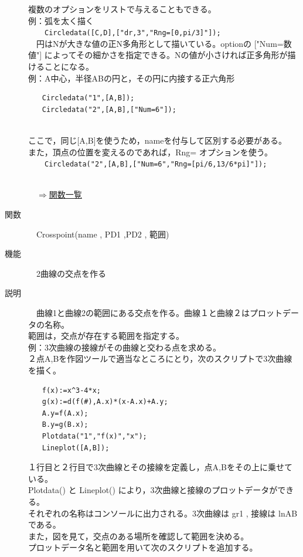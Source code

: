 \documentclass[papersize,a4paper,12pt,uplatex]{jsarticle}
\begin{document}
\begin{description}
複数のオプションをリストで与えることもできる。\\

例：弧を太く描く\\
　　\verb|Circledata([C,D],["dr,3","Rng=[0,pi/3]"]);|\\

　円はNが大きな値の正N多角形として描いている。optionの ["Num=数値"] によってその細かさを指定できる。Nの値が小さければ正多角形が描けることになる。\\
例：A中心，半径ABの円と，その円に内接する正六角形
\begin{verbatim}
　　Circledata("1",[A,B]);
　　Circledata("2",[A,B],["Num=6"]);
\end{verbatim}
　　　　　　　　\\
ここで，同じ[A,B]を使うため，nameを付与して区別する必要がある。\\
また，頂点の位置を変えるのであれば，Rng= オプションを使う。\\
　　\verb|Circledata("2",[A,B],["Num=6","Rng=[pi/6,13/6*pi]"]);|\\
　　　　　　　　\\
\begin{flushright}　\hyperlink{functionlist}{$\Rightarrow$関数一覧}\end{flushright}

\hypertarget{crosspoint}{}
\item[関数]　Crosspoint(name , PD1 ,PD2 , 範囲)
\item[機能]　2曲線の交点を作る
\item[説明]　曲線1と曲線2の範囲にある交点を作る。曲線１と曲線２はプロットデータの名称。\\
範囲は，交点が存在する範囲を指定する。\\

例：3次曲線の接線がその曲線と交わる点を求める。\\
２点A,Bを作図ツールで適当なところにとり，次のスクリプトで3次曲線を描く。
\begin{verbatim}
　　f(x):=x^3-4*x;
　　g(x):=d(f(#),A.x)*(x-A.x)+A.y;
　　A.y=f(A.x);
　　B.y=g(B.x);
　　Plotdata("1","f(x)","x");
　　Lineplot([A,B]);
\end{verbatim}
１行目と２行目で3次曲線とその接線を定義し，点A,Bをその上に乗せている。\\
Plotdata() と Lineplot() により，3次曲線と接線のプロットデータができる。\\
それぞれの名称はコンソールに出力される。3次曲線は gr1 , 接線は lnAB である。\\
また，図を見て，交点のある場所を確認して範囲を決める。\\
プロットデータ名と範囲を用いて次のスクリプトを追加する。\\


\end{description}
\end{document}
